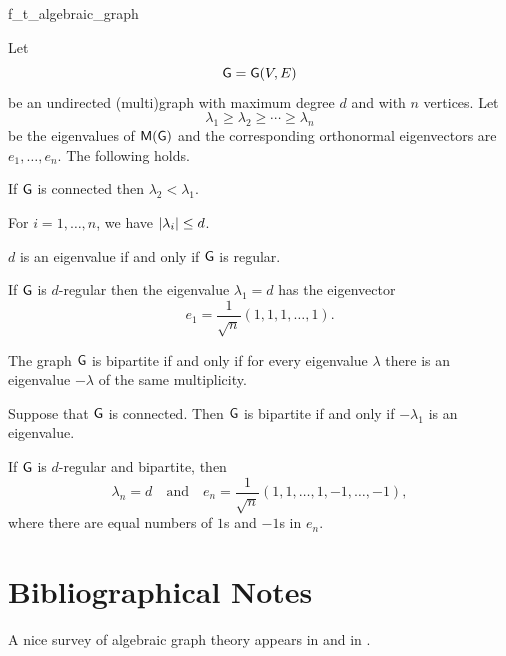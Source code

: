 \begin{fragment}{f_t_algebraic_graph}
\begin{theorem}
    \hfill\break
    Let
    \[
    \mathsf{G}= \mathsf{G}(V,E)
    \]
    be an undirected (multi)graph with maximum degree $d$ and with $n$
    vertices.  Let
    \[
    \lambda_1\geq\lambda_2\geq \cdots \geq \lambda_n
    \]
    be the eigenvalues of $\mathsf{M}(\mathsf{G})$ and the corresponding
    orthonormal eigenvectors are $e_1,\ldots, e_n$. The following
    holds.
    \begin{compactenumi}
        \item If $\mathsf{G}$ is connected then $\lambda_2 < \lambda_1$.

        \item For $i=1,\ldots, n$, we have
        $\left| {\lambda_i} \right| \leq d$.

        \item $d$ is an eigenvalue if and only if $\mathsf{G}$ is regular.

        \item If $\mathsf{G}$ is $d$-regular then the eigenvalue
        $\lambda_1=d$ has the eigenvector
        \[
        e_1 = \frac{1}{\sqrt{n}} (1,1,1, \ldots, 1).
        \]

        \item The graph $\mathsf{G}$ is bipartite if and only if for every
        eigenvalue $\lambda$ there is an eigenvalue $-\lambda$ of the
        same multiplicity.

        \item Suppose that $\mathsf{G}$ is connected. Then $\mathsf{G}$ is bipartite if
        and only if $-\lambda_1$ is an eigenvalue.

        \item If $\mathsf{G}$ is $d$-regular and bipartite, then
        \[
        \lambda_n = d
        \quad\text{and}\quad
        e_n=\frac{1}{\sqrt{n}} ( 1,1, \ldots, 1, -1, \ldots, -1),
        \]
        where there are equal numbers of $1$s and $-1$s in $e_n$.
    \end{compactenumi}
\end{theorem}
\end{fragment}



\section{Bibliographical Notes}

A nice survey of algebraic graph theory appears in \cite{w-igt-01} and
in \cite{b-mgt-98}.


\ChapterEnd{}
 

